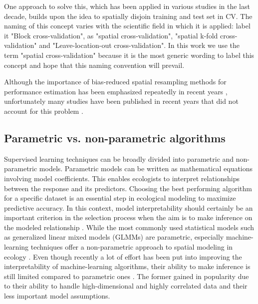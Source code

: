\documentclass[review]{elsarticle}
\begin{document}
One approach to solve this, which has been applied in various studies in the last decade, builds upon the idea to spatially disjoin training and test set in \ac{CV}.
The naming of this concept varies with the scientific field in which it is applied: \cite{Burman1994, Roberts2017, Shao1993} label it "Block cross-validation", \cite{Brenning2005} as "spatial cross-validation", \cite{pohjankukkaEstimatingPredictionPerformance2017} "spatial k-fold cross-validation" and \cite{Meyer2018} "Leave-location-out cross-validation".
In this work we use the term "spatial cross-validation" because it is the most generic wording to label this concept and hope that this naming convention will prevail.

Although the importance of bias-reduced spatial resampling methods for performance estimation has been emphasized repeatedly in recent years \citep{Geiss2017, Meyer2018, Wenger2012}, unfortunately many studies have been published in recent years that did not account for this problem \citep{Bui2015, Pourghasemi2018, Smolinski2016, Wollan2008, Youssef2015}.

\subsection{Parametric vs. non-parametric algorithms}
Supervised learning techniques can be broadly divided into parametric and non-parametric models.
Parametric models can be written as mathematical equations involving model coefficients.
This enables ecologists to interpret relationships between the response and its predictors.
Choosing the best performing algorithm for a specific dataset is an essential step in ecological modeling to maximize predictive accuracy.
In this context, model interpretability should certainly be an important criterion in the selection process when the aim is to make inference on the modeled relationship \citep{johnsonModelSelectionEcology2004}.
While the most commonly used statistical models such as generalized linear mixed models (GLMMs) are parametric, especially machine-learning techniques offer a non-parametric approach to spatial modeling in ecology \citep{deathBoostedTreesEcological2007}.
Even though recently a lot of effort has been put into improving the interpretability of machine-learning algorithms, their ability to make inference is still limited compared to parametric ones \citep{adlerAuditingBlackboxModels2018, heneliusPeekBlackBox2014}.
The former gained in popularity due to their ability to handle high-dimensional and highly correlated data and their less important model assumptions.
\end{document}
